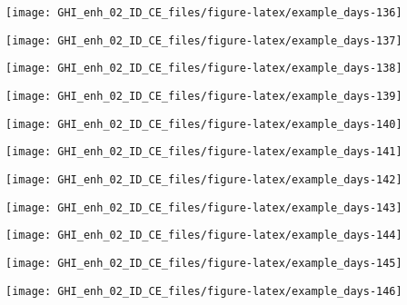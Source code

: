 \documentclass[
  10pt,
  a4paper,oneside]{article}
\begin{document}
\begin{center}\texttt{[image: GHI\_enh\_02\_ID\_CE\_files/figure-latex/example\_days-136]} \end{center}

\begin{center}\texttt{[image: GHI\_enh\_02\_ID\_CE\_files/figure-latex/example\_days-137]} \end{center}

\begin{center}\texttt{[image: GHI\_enh\_02\_ID\_CE\_files/figure-latex/example\_days-138]} \end{center}

\begin{center}\texttt{[image: GHI\_enh\_02\_ID\_CE\_files/figure-latex/example\_days-139]} \end{center}

\begin{center}\texttt{[image: GHI\_enh\_02\_ID\_CE\_files/figure-latex/example\_days-140]} \end{center}

\begin{center}\texttt{[image: GHI\_enh\_02\_ID\_CE\_files/figure-latex/example\_days-141]} \end{center}

\begin{center}\texttt{[image: GHI\_enh\_02\_ID\_CE\_files/figure-latex/example\_days-142]} \end{center}

\begin{center}\texttt{[image: GHI\_enh\_02\_ID\_CE\_files/figure-latex/example\_days-143]} \end{center}

\begin{center}\texttt{[image: GHI\_enh\_02\_ID\_CE\_files/figure-latex/example\_days-144]} \end{center}

\begin{center}\texttt{[image: GHI\_enh\_02\_ID\_CE\_files/figure-latex/example\_days-145]} \end{center}

\begin{center}\texttt{[image: GHI\_enh\_02\_ID\_CE\_files/figure-latex/example\_days-146]} \end{center}
\end{document}
